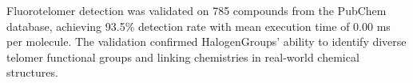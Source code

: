 
Fluorotelomer detection was validated on 785 compounds from the PubChem database, achieving 93.5\% detection rate with mean execution time of 0.00 ms per molecule. The validation confirmed HalogenGroups' ability to identify diverse telomer functional groups and linking chemistries in real-world chemical structures.

